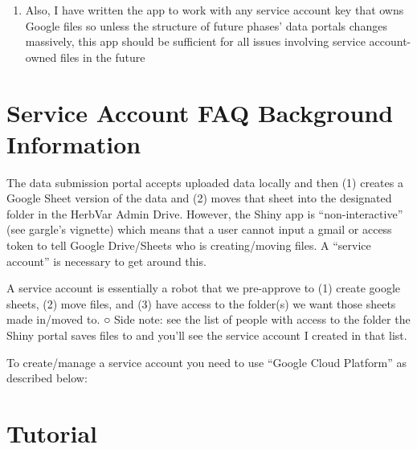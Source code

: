 \documentclass[
  letterpaper,
  DIV=11,
  numbers=noendperiod]{scrreprt}
\providecommand{\tightlist}{%
  \setlength{\itemsep}{0pt}\setlength{\parskip}{0pt}}\usepackage{longtable,booktabs,array}
\begin{document}
\begin{enumerate}
\def\labelenumi{\arabic{enumi}.}
\setcounter{enumi}{6}
\tightlist
\item
  Also, I have written the app to work with any service account key that
  owns Google files so unless the structure of future phases' data
  portals changes massively, this app should be sufficient for all
  issues involving service account-owned files in the future
\end{enumerate}

\section{Service Account FAQ Background
Information}\label{service-account-faq-background-information}

The data submission portal accepts uploaded data locally and then (1)
creates a Google Sheet version of the data and (2) moves that sheet into
the designated folder in the HerbVar Admin Drive. However, the Shiny app
is ``non-interactive'' (see gargle's vignette) which means that a user
cannot input a gmail or access token to tell Google Drive/Sheets who is
creating/moving files. A ``service account'' is necessary to get around
this.

A service account is essentially a robot that we pre-approve to (1)
create google sheets, (2) move files, and (3) have access to the
folder(s) we want those sheets made in/moved to. ○ Side note: see the
list of people with access to the folder the Shiny portal saves files to
and you'll see the service account I created in that list.

To create/manage a service account you need to use ``Google Cloud
Platform'' as described below:

\section{Tutorial}\label{tutorial}
\end{document}
